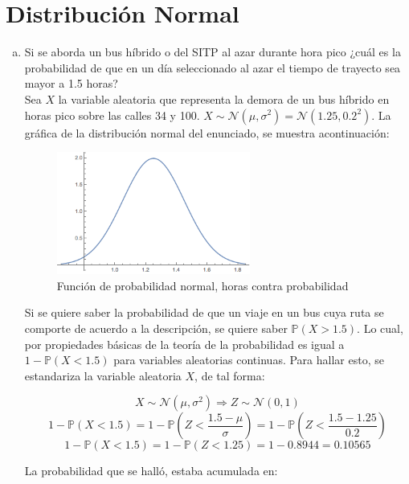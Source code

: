 \documentclass[11pt, spanish]{article}
\begin{document}
\pagebreak
\section{Distribución Normal}

\begin{enumerate}[(a)]

\item Si se aborda un bus híbrido o del SITP al azar durante hora pico ¿cuál es la
probabilidad de que en un día seleccionado al azar el tiempo de trayecto sea mayor a 1.5
horas?\\

Sea $X$ la variable aleatoria que representa la demora de un bus híbrido en horas pico sobre las calles 34 y 100. $X \sim \mathcal{N} (\mu , \sigma ^2) = \mathcal{N} (1.25, 0.2^2)$. La gráfica de la distribución normal del enunciado, se muestra acontinuación:

\begin{figure}[h]
    \centering
    \includegraphics[width=0.6\textwidth]{fig3-1.png}
    \caption{Función de probabilidad normal, horas contra probabilidad}
    \label{fig:prob_dist1}
\end{figure}

Si se quiere saber la probabilidad de que un viaje en un bus cuya ruta se comporte de acuerdo a la descripción, se quiere saber $\mathbb{P}(X > 1.5)$. Lo cual, por propiedades básicas de la teoría de la probabilidad es igual a $1 - \mathbb{P}(X < 1.5)$ para variables aleatorias continuas. Para hallar esto, se estandariza la variable aleatoria $X$, de tal forma:

$$X \sim \mathcal{N} (\mu , \sigma ^2) \Rightarrow Z \sim \mathcal{N} (0,  1)$$
$$1 - \mathbb{P}(X < 1.5) = 1 - \mathbb{P}\left(Z < \frac{1.5 - \mu}{\sigma}\right) = 1 - \mathbb{P}\left(Z < \frac{1.5 - 1.25}{0.2}\right)$$
$$1 - \mathbb{P}(X < 1.5) = 1 - \mathbb{P}\left(Z < 1.25 \right) = 1 - 0.8944 = 0.10565$$

\pagebreak
La probabilidad que se halló, estaba acumulada en:


\end{enumerate}
\end{document}
